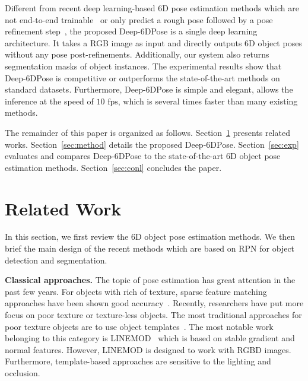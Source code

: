 \documentclass[conference]{IEEEtran}
\newcommand{\method}[1]{Deep-6DPose}
\begin{document}
Different from recent deep learning-based 6D pose estimation methods which are not end-to-end trainable~\cite{BB8} or only predict a rough pose followed by a pose refinement step~\cite{SSD-6D,BB8,posecnn}, the proposed \method{} is a single deep learning architecture. It takes a RGB image as input and directly outputs 6D object poses without any pose post-refinements. Additionally, our system also returns segmentation masks of object instances. The experimental results show that \method{} is competitive or outperforms the state-of-the-art methods on standard datasets. Furthermore, \method{} is simple and elegant, allows the inference at the speed of $\textrm{10 fps}$, which is several times faster than many existing methods.

The remainder of this paper is organized as follows. Section~\ref{sec:related} presents related works. Section~\ref{sec:method} details the proposed \method{}. Section~\ref{sec:exp} evaluates and compares \method{} to the state-of-the-art 6D object pose estimation methods. Section~\ref{sec:conl} concludes the paper. 

\section{Related Work}\label{sec:related}
In this section, we first review the 6D object pose estimation methods.  We then brief the main design of the recent methods which are based on RPN for object detection and segmentation.

\textbf{Classical approaches.} The topic of pose estimation has great attention in the past few years. For objects with rich of texture, sparse feature matching approaches have been shown good accuracy~\cite{DBLP:conf/clor/GordonL06,SIFT_Lowe,DBLP:conf/icra/MartinezCS10}. Recently, researchers have put more focus on poor texture or texture-less objects. The most traditional approaches for poor texture objects are to use object templates~\cite{ACCV12,DBLP:conf/eccv/TejaniTKK14,DBLP:conf/iccv/Rios-CabreraT13}. The most notable work belonging to this category is LINEMOD~\cite{ACCV12} which is based on stable gradient and normal features. However, LINEMOD is designed to work with RGBD images. Furthermore, template-based approaches are sensitive to the lighting and occlusion. 
\end{document}

